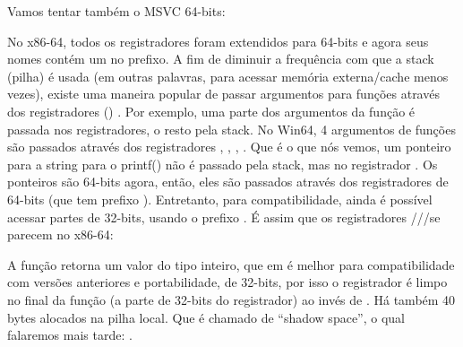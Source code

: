 
Vamos tentar também o MSVC 64-bits:




No x86-64, todos os registradores foram extendidos para 64-bits e agora seus nomes contém um  no prefixo.
A fim de diminuir a frequência com que a stack (pilha) é usada (em outras palavras, para acessar memória externa/cache menos vezes),
existe uma maneira popular de passar argumentos para funções através dos registradores () .
Por exemplo, uma parte dos argumentos da função é passada nos registradores, o resto pela stack.
No Win64, 4 argumentos de funções são passados através dos registradores \RCX, \RDX, , .
Que é o que nós vemos, um ponteiro para a string para o printf() não é passado pela stack, mas no registrador \RCX.
Os ponteiros são 64-bits agora, então, eles são passados através dos registradores de 64-bits (que tem prefixo ).
Entretanto, para compatibilidade, ainda é possível acessar partes de 32-bits, usando o prefixo .
É assim que os registradores \RAX/\EAX/\AX/\AL se parecem no x86-64:


A função \main retorna um valor do tipo inteiro, que em \CCpp é melhor para compatibilidade com versões anteriores e portabilidade,
de 32-bits, por isso o registrador \EAX é limpo no final da função (a parte de 32-bits do registrador) ao invés de \RAX.
Há também 40 bytes alocados na pilha local.
Que é chamado de ``shadow space'', o qual falaremos mais tarde: .


